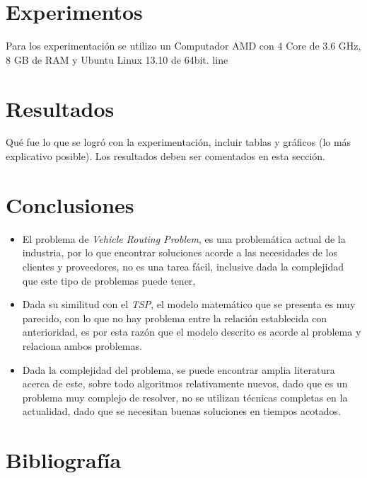 \documentclass[letter, 10pt]{article}
\begin{document}
\newpage
\section{Experimentos}
Para los experimentaci\'on se utilizo un Computador AMD con 4 Core de 3.6 GHz, 8 GB de RAM y Ubuntu Linux 13.10 de 64bit.
\new line

\newpage
\section{Resultados}
Qu\'e fue lo que se logr\'o con la experimentaci\'on, incluir tablas y gr\'aficos (lo m\'as explicativo posible).
Los resultados deben ser comentados en esta secci\'on.

\newpage
\section{Conclusiones}
\begin{itemize}
 \item El problema de \emph{Vehicle Routing Problem}, es una problem\'atica actual de la industria, por lo que encontrar soluciones acorde 
 a las necesidades de los clientes y proveedores, no es una tarea f\'acil, inclusive dada la complejidad que este tipo de problemas puede tener,
 \item Dada su similitud con el \emph{TSP}, el modelo matem\'atico que se presenta es muy parecido, con lo que no hay problema entre la 
 relaci\'on establecida con anterioridad, es por esta raz\'on que el modelo descrito es acorde al problema y relaciona ambos problemas.
 \item Dada la complejidad del problema, se puede encontrar amplia literatura acerca de este, sobre todo algoritmos relativamente nuevos, dado que
 es un problema muy complejo de resolver, no se utilizan t\'ecnicas completas en la actualidad, dado que se necesitan buenas soluciones en tiempos 
 acotados.
 \end{itemize}

\newpage
\section{Bibliograf\'ia}


\end{document}
